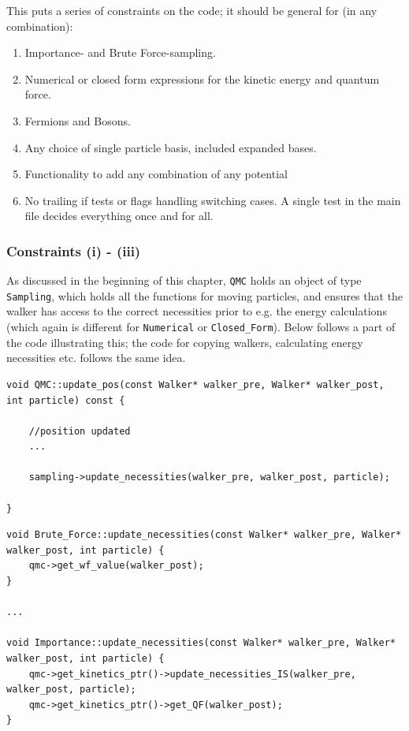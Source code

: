This puts a series of constraints on the code; it should be general for (in any combination):

\begin{enumerate}[label=(\roman{*}), ref=(\roman{*})]
\item Importance- and Brute Force-sampling.
\item Numerical or closed form expressions for the kinetic energy and quantum force.
\item Fermions and Bosons.
\item Any choice of single particle basis, included expanded bases.
\item Functionality to add any combination of any potential
\item No trailing if tests or flags handling switching cases. A single test in the main file decides everything once and for all. 
\end{enumerate}


\subsubsection{Constraints (i) - (iii)}

As discussed in the beginning of this chapter, \verb+QMC+ holds an object of type \verb+Sampling+, which holds all the functions for moving particles, and ensures that the walker has access to the correct necessities prior to e.g. the energy calculations (which again is different for \verb+Numerical+ or \verb+Closed_Form+). Below follows a part of the code illustrating this; the code for copying walkers, calculating energy necessities etc. follows the same idea.

\vspace{0.5cm}
\begin{lstlisting}
void QMC::update_pos(const Walker* walker_pre, Walker* walker_post, int particle) const {

    //position updated
    ...
      
    sampling->update_necessities(walker_pre, walker_post, particle);

}
\end{lstlisting}

\begin{lstlisting}
void Brute_Force::update_necessities(const Walker* walker_pre, Walker* walker_post, int particle) {
    qmc->get_wf_value(walker_post);
}

...

void Importance::update_necessities(const Walker* walker_pre, Walker* walker_post, int particle) {
    qmc->get_kinetics_ptr()->update_necessities_IS(walker_pre, walker_post, particle);
    qmc->get_kinetics_ptr()->get_QF(walker_post);
}
\end{lstlisting}

